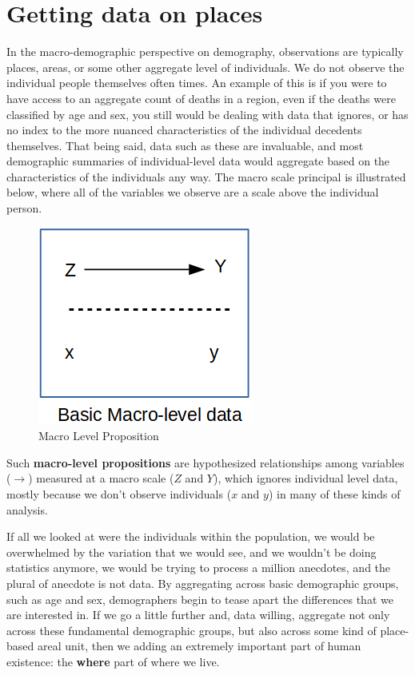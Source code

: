 \documentclass[
  letterpaper,
  DIV=11,
  numbers=noendperiod]{scrreprt}
\begin{document}
\hypertarget{getting-data-on-places}{%
\section{Getting data on places}\label{getting-data-on-places}}

In the macro-demographic perspective on demography, observations are
typically places, areas, or some other aggregate level of individuals.
We do not observe the individual people themselves often times. An
example of this is if you were to have access to an aggregate count of
deaths in a region, even if the deaths were classified by age and sex,
you still would be dealing with data that ignores, or has no index to
the more nuanced characteristics of the individual decedents themselves.
That being said, data such as these are invaluable, and most demographic
summaries of individual-level data would aggregate based on the
characteristics of the individuals any way. The macro scale principal is
illustrated below, where all of the variables we observe are a scale
above the individual person.

\begin{figure}

{\centering \includegraphics{images/macro2.png}

}

\caption{Macro Level Proposition}

\end{figure}

Such \textbf{macro-level propositions} are hypothesized relationships
among variables (\(\rightarrow\)) measured at a macro scale (\(Z\) and
\(Y\)), which ignores individual level data, mostly because we don't
observe individuals (\(x\) and \(y\)) in many of these kinds of
analysis.

If all we looked at were the individuals within the population, we would
be overwhelmed by the variation that we would see, and we wouldn't be
doing statistics anymore, we would be trying to process a million
anecdotes, and the plural of anecdote is not data. By aggregating across
basic demographic groups, such as age and sex, demographers begin to
tease apart the differences that we are interested in. If we go a little
further and, data willing, aggregate not only across these fundamental
demographic groups, but also across some kind of place-based areal unit,
then we adding an extremely important part of human existence: the
\textbf{where} part of where we live.
\end{document}
